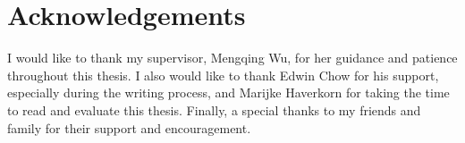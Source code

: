 \section*{Acknowledgements}

I would like to thank my supervisor, Mengqing Wu, for her guidance and patience throughout this thesis. I also would like to thank Edwin Chow for his support, especially during the writing process, and Marijke Haverkorn for taking the time to read and evaluate this thesis.
Finally, a special thanks to my friends and family for their support and encouragement.